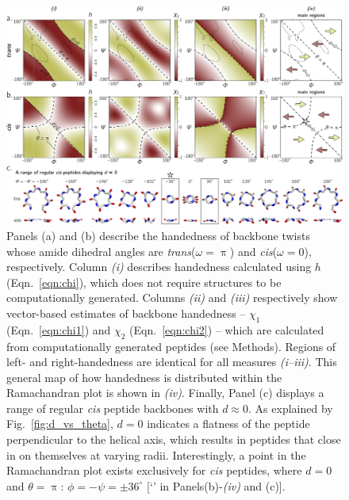 \documentclass[fleqn,10pt,lineno]{wlpeerj} %
\newcommand{\n}[1]{{\color{blue}#1}}
\newcommand{\Fig}[1]{Fig.~\ref{#1}}
\newcommand{\Eqn}[1]{Eqn.~\ref{#1}}
\newcommand{\h}{h}
\newcommand{\cis}{{\em cis}\xspace}
\newcommand{\trans}{{\em trans}\xspace}
\begin{document}
{\begin{figure}[t!]
\begin{adjustwidth}{-1in}{0in} %
\centering
\includegraphics[width=0.8\linewidth]{./figures/various_chis.pdf}
\caption{\label{fig:chi_all} 
Panels (a) and (b) describe the handedness of backbone twists whose amide dihedral angles are \trans ($\omega=\uppi$) and \cis ($\omega=0$), respectively. Column \textit{(i)} describes handedness calculated using $\h$ (\Eqn{eqn:chi}), which does not require structures to be computationally generated. Columns \textit{(ii)} and \textit{(iii)} respectively show vector-based estimates of backbone handedness -- $\chi_1$ (\Eqn{eqn:chi1}) and $\chi_2$ (\Eqn{eqn:chi2}) -- which are calculated from computationally generated peptides (see Methods). Regions of left- and right-handedness are identical for all measures \textit{(i--iii)}. This general map of how handedness is distributed within the Ramachandran plot is shown in \textit{(iv)}.  \n{Finally, Panel (c) displays a range of regular \cis peptide backbones with $d\approx0$. As explained by \Fig{fig:d_vs_theta}, $d=0$ indicates a flatness of the peptide perpendicular to the helical axis, which results in peptides that close in on themselves at varying radii. Interestingly, a point in the Ramachandran plot exists exclusively for \cis peptides, where $d=0$ and $\theta=\uppi$: $\phi=-\psi=\pm 36^\circ$ [`\FiveStarOpen' in Panels(b)-\textit{(iv)} and (c)].} }
\end{adjustwidth}
\end{figure}

}
\end{document}
